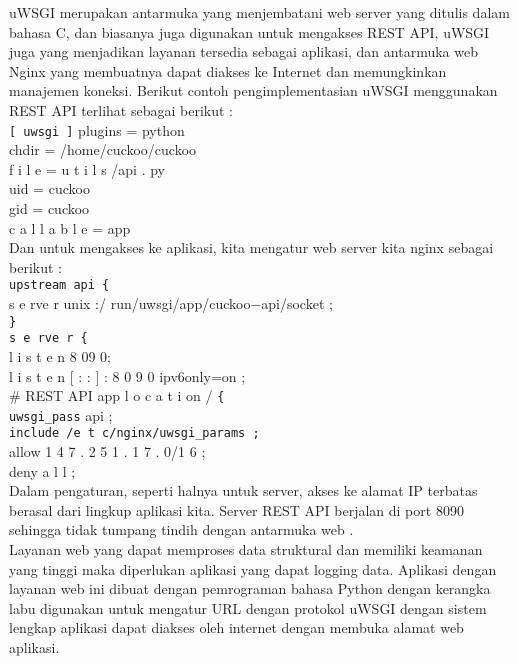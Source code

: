 	uWSGI merupakan antarmuka yang menjembatani web server yang ditulis dalam bahasa C, dan biasanya juga digunakan untuk mengakses REST API, uWSGI juga yang menjadikan layanan tersedia sebagai aplikasi, dan antarmuka web Nginx yang membuatnya dapat diakses ke Internet dan memungkinkan manajemen koneksi. Berikut contoh pengimplementasian uWSGI menggunakan REST API terlihat sebagai berikut :\\
\verb|[ uwsgi ]|
plugins = python\\
chdir = /home/cuckoo/cuckoo \\
f i l e = u t i l s /api . py\\
uid = cuckoo\\
gid = cuckoo\\
c a l l a b l e = app\\

Dan untuk mengakses ke aplikasi, kita mengatur web server kita nginx sebagai berikut :\\
\verb|upstream api {|\\
s e rve r unix :/ run/uwsgi/app/cuckoo−api/socket ;\\
\verb|}|\\
\verb|s e rve r {|\\
l i s t e n 8 09 0;\\
l i s t e n [ : : ] : 8 0 9 0 ipv6only=on ;\\
\# REST API app
l o c a t i on / \verb|{| \\
\verb|uwsgi_pass| api ;\\
\verb|include /e t c/nginx/uwsgi_params ;|\\
allow 1 4 7 . 2 5 1 . 1 7 . 0/1 6 ; \\
deny a l l ;\\

Dalam pengaturan, seperti halnya untuk server, akses ke alamat IP terbatas berasal dari lingkup aplikasi kita. Server REST API berjalan di port 8090 sehingga tidak tumpang tindih dengan antarmuka web \cite{beran2017analyza}.\\

Layanan web yang dapat memproses data struktural dan memiliki keamanan yang tinggi maka diperlukan aplikasi yang dapat logging data. Aplikasi dengan layanan web ini dibuat dengan pemrograman bahasa Python dengan kerangka labu digunakan untuk mengatur URL dengan protokol uWSGI dengan sistem lengkap aplikasi dapat diakses oleh internet dengan membuka alamat web aplikasi\cite{rudiana2015perancangan}.





